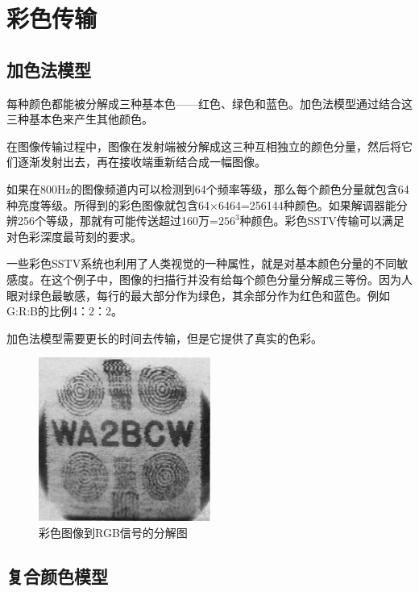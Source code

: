 \section{彩色传输}

\subsection{加色法模型}

每种颜色都能被分解成三种基本色——红色、绿色和蓝色。加色法模型通过结合这三种基本色来产生其他颜色。

在图像传输过程中，图像在发射端被分解成这三种互相独立的颜色分量，然后将它们逐渐发射出去，再在接收端重新结合成一幅图像。

如果在800Hz的图像频道内可以检测到64个频率等级，那么每个颜色分量就包含64种亮度等级。所得到的彩色图像就包含64×6464=256144种颜色。如果解调器能分辨256个等级，那就有可能传送超过160万=$256^{3}$种颜色。彩色SSTV传输可以满足对色彩深度最苛刻的要求。

一些彩色SSTV系统也利用了人类视觉的一种属性，就是对基本颜色分量的不同敏感度。在这个例子中，图像的扫描行并没有给每个颜色分量分解成三等份。因为人眼对绿色最敏感，每行的最大部分作为绿色，其余部分作为红色和蓝色。例如G:R:B的比例4：2：2。

加色法模型需要更长的时间去传输，但是它提供了真实的色彩。

\begin{figure}
	\centering
	\includegraphics[width=0.7\linewidth]{figs/obrazek1.png}
	\caption{彩色图像到RGB信号的分解图}
\end{figure}


\subsection{复合颜色模型}

